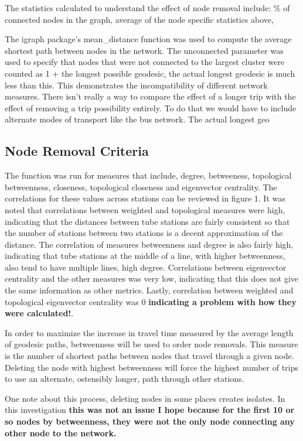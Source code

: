 \documentclass[11pt]{article} %
\begin{document}
The statistics calculated to understand the effect of node removal include: \% of connected nodes in the graph, average of the node specific statistics above, 

The igraph package's mean\_distance\(\) function was used to compute the average shortest path between nodes in the network. The unconnected parameter was used to specify that nodes that were not connected to the largest cluster were counted as 1 + the longest possible geodesic, the actual longest geodesic is much less than this. This demonstrates the incompatibility of different network measures. There isn't really a way to compare the effect of a longer trip with the effect of removing a trip possibility entirely. To do that we would have to include alternate modes of transport like the bus network.  The actual longest geo

\subsection{Node Removal Criteria}

The function was run for measures that include, degree, betweeness, topological betweenness, closeness, topological closeness and eigenvector centrality. The correlations for these values across stations can be reviewed in figure 1. It was noted that correlations between weighted and topological measures were high, indicating that the distances between tube stations are fairly consistent so that the number of stations between two stations is a decent approximation of the distance. The correlation of measures betweenness and degree is also fairly high, indicating that tube stations at the middle of a line, with higher betweenness, also tend to have multiple lines, high degree. Correlations between eigenvector centrality and the other measures was very low, indicating that this does not give the same information as other metrics. Lastly, correlation between weighted and topological eigenvector centrality was 0 \textbf{indicating a problem with how they were calculated!}. 

In order to maximize the increase in travel time measured by the average length of geodesic paths, betweenness will be used to order node removals. This measure is the number of shortest paths between nodes that travel through a given node. Deleting the node with highest betweenness will force the highest number of trips to use an alternate, ostensibly longer, path through other stations. 

One note about this process, deleting nodes in some places creates isolates. In this investigation \textbf{this was not an issue I hope because for the first 10 or so nodes by betweenness, they were not the only node connecting any other node to the network.}
\end{document}
